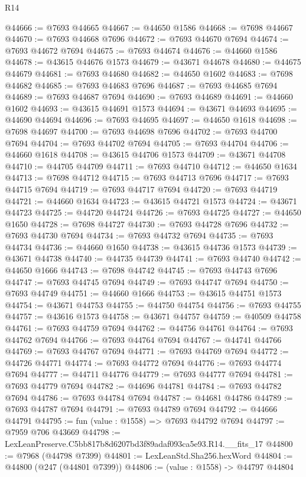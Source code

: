 \begin{lexlean}{R14}
\begin{coremodule}
@44666 := @7693 @44665
@44667 := @44650 @1586
@44668 := @7698 @44667
@44670 := @7693 @44668 @7696
@44672 := @7693 @44670 @7694
@44674 := @7693 @44672 @7694
@44675 := @7693 @44674
@44676 := @44660 @1586
@44678 := @43615 @44676 @1573
@44679 := @43671 @44678
@44680 := @44675 @44679
@44681 := @7693 @44680
@44682 := @44650 @1602
@44683 := @7698 @44682
@44685 := @7693 @44683 @7696
@44687 := @7693 @44685 @7694
@44689 := @7693 @44687 @7694
@44690 := @7693 @44689
@44691 := @44660 @1602
@44693 := @43615 @44691 @1573
@44694 := @43671 @44693
@44695 := @44690 @44694
@44696 := @7693 @44695
@44697 := @44650 @1618
@44698 := @7698 @44697
@44700 := @7693 @44698 @7696
@44702 := @7693 @44700 @7694
@44704 := @7693 @44702 @7694
@44705 := @7693 @44704
@44706 := @44660 @1618
@44708 := @43615 @44706 @1573
@44709 := @43671 @44708
@44710 := @44705 @44709
@44711 := @7693 @44710
@44712 := @44650 @1634
@44713 := @7698 @44712
@44715 := @7693 @44713 @7696
@44717 := @7693 @44715 @7694
@44719 := @7693 @44717 @7694
@44720 := @7693 @44719
@44721 := @44660 @1634
@44723 := @43615 @44721 @1573
@44724 := @43671 @44723
@44725 := @44720 @44724
@44726 := @7693 @44725
@44727 := @44650 @1650
@44728 := @7698 @44727
@44730 := @7693 @44728 @7696
@44732 := @7693 @44730 @7694
@44734 := @7693 @44732 @7694
@44735 := @7693 @44734
@44736 := @44660 @1650
@44738 := @43615 @44736 @1573
@44739 := @43671 @44738
@44740 := @44735 @44739
@44741 := @7693 @44740
@44742 := @44650 @1666
@44743 := @7698 @44742
@44745 := @7693 @44743 @7696
@44747 := @7693 @44745 @7694
@44749 := @7693 @44747 @7694
@44750 := @7693 @44749
@44751 := @44660 @1666
@44753 := @43615 @44751 @1573
@44754 := @43671 @44753
@44755 := @44750 @44754
@44756 := @7693 @44755
@44757 := @43616 @1573
@44758 := @43671 @44757
@44759 := @40509 @44758
@44761 := @7693 @44759 @7694
@44762 := @44756 @44761
@44764 := @7693 @44762 @7694
@44766 := @7693 @44764 @7694
@44767 := @44741 @44766
@44769 := @7693 @44767 @7694
@44771 := @7693 @44769 @7694
@44772 := @44726 @44771
@44774 := @7693 @44772 @7694
@44776 := @7693 @44774 @7694
@44777 := @44711 @44776
@44779 := @7693 @44777 @7694
@44781 := @7693 @44779 @7694
@44782 := @44696 @44781
@44784 := @7693 @44782 @7694
@44786 := @7693 @44784 @7694
@44787 := @44681 @44786
@44789 := @7693 @44787 @7694
@44791 := @7693 @44789 @7694
@44792 := @44666 @44791
@44795 := fun (value : @1558) => @7693 @44792 @7694
@44797 := @7959 @706 @43669
@44798 := LexLeanPreserve.C5bb817b8d6207bd3f89adaf093ca5e93.R14.__fits_17
@44800 := @7968 (@44798 @7399)
@44801 := LexLeanStd.Sha256.hexWord
@44804 := @44800 (@247 (@44801 @7399))
@44806 := (value : @1558) -> @44797 @44804

\end{coremodule}
\end{lexlean}
